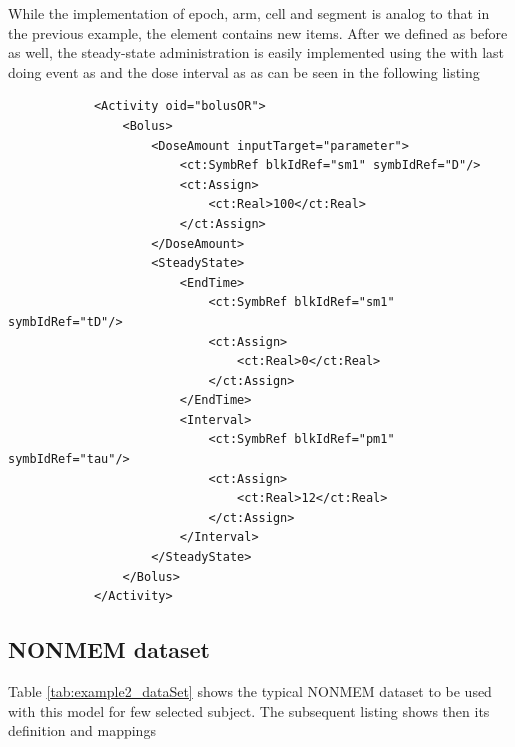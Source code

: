While the implementation of epoch, arm, cell and segment is analog to that in the 
previous example, the  element contains new items. After we 
defined  as before as well, the steady-state administration 
is easily implemented using the  with last doing event as
 and the dose interval as  as can be seen 
in the following listing 
\lstset{language=XML}
\begin{lstlisting}
            <Activity oid="bolusOR">
                <Bolus>
                    <DoseAmount inputTarget="parameter">
                        <ct:SymbRef blkIdRef="sm1" symbIdRef="D"/>
                        <ct:Assign>
                            <ct:Real>100</ct:Real>
                        </ct:Assign>
                    </DoseAmount>
                    <SteadyState>
                        <EndTime>
                            <ct:SymbRef blkIdRef="sm1" symbIdRef="tD"/>
                            <ct:Assign>
                                <ct:Real>0</ct:Real>
                            </ct:Assign>
                        </EndTime>
                        <Interval>
                            <ct:SymbRef blkIdRef="pm1" symbIdRef="tau"/>
                            <ct:Assign>
                                <ct:Real>12</ct:Real>
                            </ct:Assign>
                        </Interval>
                    </SteadyState>
                </Bolus>
            </Activity>
\end{lstlisting}


\subsection{NONMEM dataset}
\label{sec:eg2-NONMEMdataset}
Table \ref{tab:example2_dataSet} shows the typical NONMEM dataset 
to be used with this model for few selected subject. The subsequent
listing shows then its definition and mappings  



